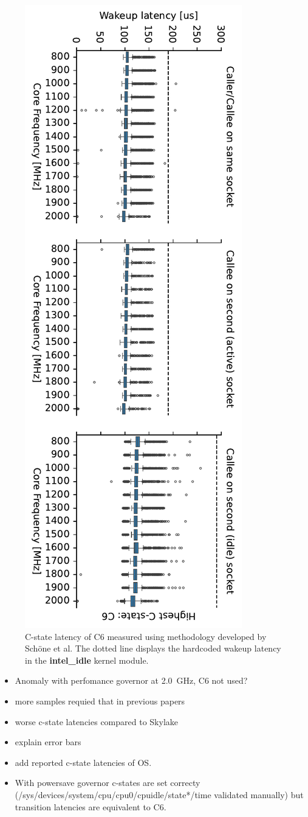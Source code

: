 \begin{figure}[!ht]
    \centering
    \includegraphics[height=\columnwidth,angle=90]{fig/C_state_latencies.pdf}
    \caption{\label{fig:c6_latencies}C-state latency of C6 measured using methodology developed by Schöne et al. 
The dotted line displays the hardcoded wakeup latency in the \protect\textbf{intel\_idle} kernel module.
\protect\footnotemark}
\end{figure}

\begin{itemize}
    \item Anomaly with perfomance governor at \SI{2.0}{\GHz}, C6 not used?
    \item more samples requied that in previous papers
    \item worse c-state latencies compared to Skylake
    \item explain error bars
    \item add reported c-state latencies of OS.
    \item With powersave governor c-states are set correcty (/sys/devices/system/cpu/cpu0/cpuidle/state*/time validated manually) but transition latencies are equivalent to C6.
\end{itemize}

